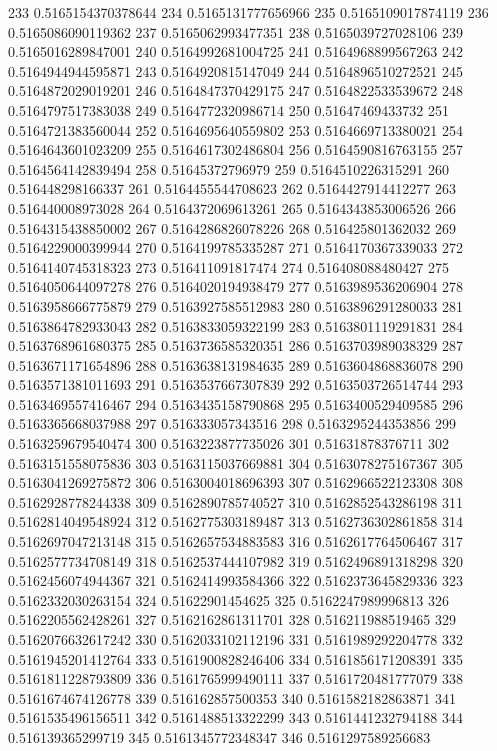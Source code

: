 233 0.5165154370378644
234 0.5165131777656966
235 0.5165109017874119
236 0.5165086090119362
237 0.5165062993477351
238 0.5165039727028106
239 0.5165016289847001
240 0.5164992681004725
241 0.5164968899567263
242 0.5164944944595871
243 0.5164920815147049
244 0.5164896510272521
245 0.5164872029019201
246 0.5164847370429175
247 0.5164822533539672
248 0.5164797517383038
249 0.5164772320986714
250 0.51647469433732
251 0.5164721383560044
252 0.5164695640559802
253 0.5164669713380021
254 0.5164643601023209
255 0.5164617302486804
256 0.5164590816763155
257 0.5164564142839494
258 0.51645372796979
259 0.5164510226315291
260 0.516448298166337
261 0.5164455544708623
262 0.5164427914412277
263 0.516440008973028
264 0.5164372069613261
265 0.5164343853006526
266 0.5164315438850002
267 0.5164286826078226
268 0.516425801362032
269 0.5164229000399944
270 0.5164199785335287
271 0.5164170367339033
272 0.5164140745318323
273 0.516411091817474
274 0.516408088480427
275 0.5164050644097278
276 0.5164020194938479
277 0.5163989536206904
278 0.5163958666775879
279 0.5163927585512983
280 0.5163896291280033
281 0.5163864782933043
282 0.5163833059322199
283 0.5163801119291831
284 0.5163768961680375
285 0.5163736585320351
286 0.5163703989038329
287 0.5163671171654896
288 0.5163638131984635
289 0.5163604868836078
290 0.5163571381011693
291 0.5163537667307839
292 0.5163503726514744
293 0.5163469557416467
294 0.5163435158790868
295 0.5163400529409585
296 0.5163365668037988
297 0.516333057343516
298 0.5163295244353856
299 0.5163259679540474
300 0.5163223877735026
301 0.51631878376711
302 0.5163151558075836
303 0.5163115037669881
304 0.5163078275167367
305 0.5163041269275872
306 0.5163004018696393
307 0.5162966522123308
308 0.5162928778244338
309 0.5162890785740527
310 0.5162852543286198
311 0.5162814049548924
312 0.5162775303189487
313 0.5162736302861858
314 0.5162697047213148
315 0.5162657534883583
316 0.5162617764506467
317 0.5162577734708149
318 0.5162537444107982
319 0.5162496891318298
320 0.5162456074944367
321 0.5162414993584366
322 0.5162373645829336
323 0.5162332030263154
324 0.51622901454625
325 0.5162247989996813
326 0.5162205562428261
327 0.5162162861311701
328 0.516211988519465
329 0.5162076632617242
330 0.5162033102112196
331 0.5161989292204778
332 0.5161945201412764
333 0.5161900828246406
334 0.5161856171208391
335 0.5161811228793809
336 0.5161765999490111
337 0.5161720481777079
338 0.5161674674126778
339 0.516162857500353
340 0.5161582182863871
341 0.5161535496156511
342 0.5161488513322299
343 0.5161441232794188
344 0.516139365299719
345 0.5161345772348347
346 0.5161297589256683
